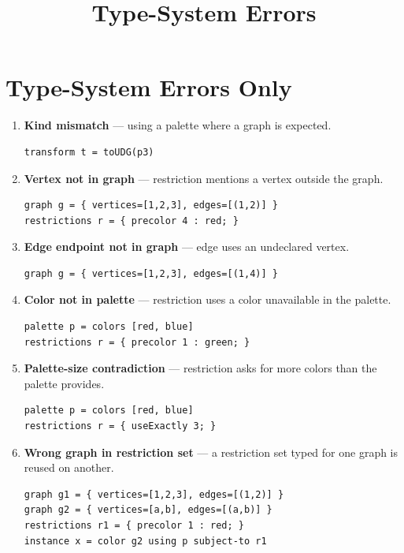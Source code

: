 \documentclass[11pt]{article}
\title{Type-System Errors}
\author{}
\date{}
\begin{document}
\maketitle

\section*{Type-System Errors Only}

\begin{enumerate}
  \item \textbf{Kind mismatch} --- using a palette where a graph is expected.
\begin{lstlisting}[style=plain]
transform t = toUDG(p3)
\end{lstlisting}

  \item \textbf{Vertex not in graph} --- restriction mentions a vertex outside the graph.
\begin{lstlisting}[style=plain]
graph g = { vertices=[1,2,3], edges=[(1,2)] }
restrictions r = { precolor 4 : red; }
\end{lstlisting}

  \item \textbf{Edge endpoint not in graph} --- edge uses an undeclared vertex.
\begin{lstlisting}[style=plain]
graph g = { vertices=[1,2,3], edges=[(1,4)] }
\end{lstlisting}

  \item \textbf{Color not in palette} --- restriction uses a color unavailable in the palette.
\begin{lstlisting}[style=plain]
palette p = colors [red, blue]
restrictions r = { precolor 1 : green; }
\end{lstlisting}

  \item \textbf{Palette-size contradiction} --- restriction asks for more colors than the palette provides.
\begin{lstlisting}[style=plain]
palette p = colors [red, blue]
restrictions r = { useExactly 3; }
\end{lstlisting}

  \item \textbf{Wrong graph in restriction set} --- a restriction set typed for one graph is reused on another.
\begin{lstlisting}[style=plain]
graph g1 = { vertices=[1,2,3], edges=[(1,2)] }
graph g2 = { vertices=[a,b], edges=[(a,b)] }
restrictions r1 = { precolor 1 : red; }
instance x = color g2 using p subject-to r1
\end{lstlisting}


\end{enumerate}
\end{document}
